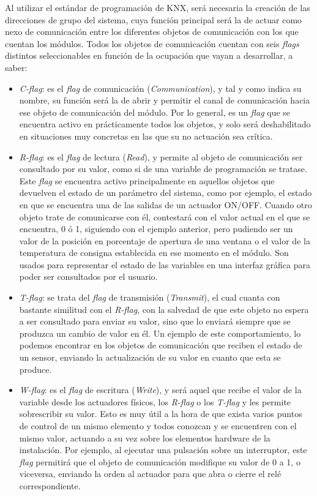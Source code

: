 Al utilizar el estándar de programación de KNX, será necesaria la creación de las direcciones de grupo del sistema, cuya función principal será la de actuar como nexo de comunicación entre los diferentes objetos de comunicación con los que cuentan los módulos. Todos los objetos de comunicación cuentan con seis \textit{flags} distintos seleccionables en función de la ocupación que vayan a desarrollar, a saber:
\begin{itemize}
\item \textit {C-flag}: es el \textit{flag} de comunicación (\textit {Communication}), y tal y como indica su nombre, su función será la de abrir y permitir el canal de comunicación hacia ese objeto de comunicación del módulo. Por lo general, es un \textit{flag} que se encuentra activo en prácticamente todos los objetos, y solo será deshabilitado en situaciones muy concretas en las que su no actuación sea crítica.
\item \textit {R-flag}: es el \textit{flag} de lectura (\textit {Read}), y permite al objeto de comunicación ser consultado por su valor, como si de una variable de programación se tratase. Este \textit{flag} se encuentra activo principalmente en aquellos objetos que devuelven el estado de un parámetro del sistema, como por ejemplo, el estado en que se encuentra una de las salidas de un actuador ON/OFF. Cuando otro objeto trate de comunicarse con él, contestará con el valor actual en el que se encuentra, 0 ó 1, siguiendo con el ejemplo anterior, pero pudiendo ser un valor de la posición en porcentaje de apertura de una ventana o el valor de la temperatura de consigna establecida en ese momento en el módulo. Son usados para representar el estado de las variables en una interfaz gráfica para poder ser consultados por el usuario.
\item \textit {T-flag}: se trata del \textit{flag} de transmisión (\textit {Transmit}), el cual cuanta con bastante similitud con el \textit {R-flag}, con la salvedad de que este objeto no espera a ser consultado para enviar su valor, sino que lo enviará siempre que se produzca un cambio de valor en él. Un ejemplo de este comportamiento, lo podemos encontrar en los objetos de comunicación que reciben el estado de un sensor, enviando la actualización de su valor en cuanto que esta se produce.
\item \textit {W-flag}: es el \textit{flag} de escritura (\textit {Write}), y será aquel que recibe el valor de la variable desde los actuadores físicos, los \textit{R-flag} o los \textit{T-flag} y les permite sobrescribir su valor. Esto es muy útil a la hora de que exista varios puntos de control de un mismo elemento y todos conozcan y se encuentren con el mismo valor, actuando a su vez sobre los elementos hardware de la instalación. Por ejemplo, al ejecutar una pulsación sobre un interruptor, este \textit{flag} permitirá que el objeto de comunicación modifique su valor de 0 a 1, o viceversa, enviando la orden al actuador para que abra o cierre el relé correspondiente.

\end{itemize}
